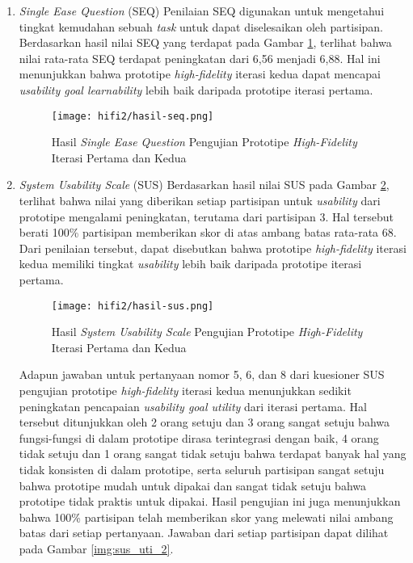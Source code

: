 
\begin{enumerate}
  \item \textit{Single Ease Question} (SEQ)
  \subitem  Penilaian SEQ digunakan untuk mengetahui tingkat kemudahan sebuah \textit{task} untuk dapat diselesaikan oleh partisipan. Berdasarkan hasil nilai SEQ yang terdapat pada Gambar \ref{img:seq_2}, terlihat bahwa nilai rata-rata SEQ terdapat peningkatan dari 6,56 menjadi 6,88. Hal ini menunjukkan bahwa prototipe \textit{high-fidelity} iterasi kedua dapat mencapai \textit{usability goal learnability} lebih baik daripada prototipe iterasi pertama. 

  \begin{figure}[h]
    \centering
    \texttt{[image: hifi2/hasil-seq.png]}
    \caption{Hasil \textit{Single Ease Question} Pengujian Prototipe \textit{High-Fidelity} Iterasi Pertama dan Kedua}
    \label{img:seq_2}
  \end{figure}
  \FloatBarrier

  \item \textit{System Usability Scale} (SUS)
  \subitem  Berdasarkan hasil nilai SUS pada Gambar \ref{img:sus_2}, terlihat bahwa nilai yang diberikan setiap partisipan untuk \textit{usability} dari prototipe mengalami peningkatan, terutama dari partisipan 3. Hal tersebut berati 100\% partisipan memberikan skor di atas ambang batas rata-rata 68. Dari penilaian tersebut, dapat disebutkan bahwa prototipe \textit{high-fidelity} iterasi kedua memiliki tingkat \textit{usability} lebih baik daripada prototipe iterasi pertama.

  \begin{figure}[h]
    \centering
    \texttt{[image: hifi2/hasil-sus.png]}
    \caption{Hasil \textit{System Usability Scale} Pengujian Prototipe \textit{High-Fidelity} Iterasi Pertama dan Kedua}
    \label{img:sus_2}
  \end{figure}
  \FloatBarrier

  Adapun jawaban untuk pertanyaan nomor 5, 6, dan 8 dari kuesioner SUS pengujian prototipe \textit{high-fidelity} iterasi kedua menunjukkan sedikit peningkatan pencapaian \textit{usability goal utility} dari iterasi pertama. Hal tersebut ditunjukkan oleh 2 orang setuju dan 3 orang sangat setuju bahwa fungsi-fungsi di dalam prototipe dirasa terintegrasi dengan baik, 4 orang tidak setuju dan 1 orang sangat tidak setuju bahwa terdapat banyak hal yang tidak konsisten di dalam prototipe, serta seluruh partisipan sangat setuju bahwa prototipe mudah untuk dipakai dan sangat tidak setuju bahwa prototipe tidak praktis untuk dipakai. Hasil pengujian ini juga menunjukkan bahwa 100\% partisipan telah memberikan skor yang melewati nilai ambang batas dari setiap pertanyaan. Jawaban dari setiap partisipan dapat dilihat pada Gambar \ref{img:sus_uti_2}.


\end{enumerate}

